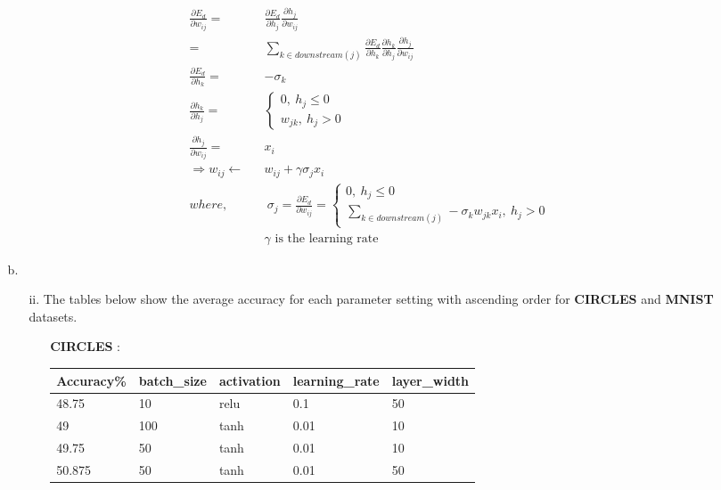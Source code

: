 \begin{enumerate}
\begin{enumerate}
		\begin{eqnarray}
		\frac{\partial E_d}{\partial w_{ij}} = && \frac{\partial E_d}{\partial h_j} \frac{\partial h_j}{\partial w_{ij}}\\
		= &&\sum_{k \in downstream(j)} \frac{\partial E_d}{\partial h_k} \frac{\partial h_k}{\partial h_j} \frac{\partial h_j}{\partial w_{ij}}\\
		\frac{\partial E_d}{\partial h_k} = && -\sigma_k\\
		\frac{\partial h_k}{\partial h_j} = && 
			\begin{cases}
			0, \: h_j \leq0\\
			w_{jk}, \: h_j > 0
			\end{cases}\\
		\frac{\partial h_j}{\partial w_{ij}} = && x_i\\
		\Rightarrow w_{ij} \leftarrow && w_{ij} + \gamma \sigma_j x_i\\
		where, && \: \sigma_j = \frac{\partial E_d}{\partial w_{ij}} = 
			\begin{cases}
			0, \: h_j \leq 0\\
			\sum_{k \in downstream(j)} -\sigma_k w_{jk} x_i, \: h_j>0
			\end{cases}\\
		&& \gamma \text{ is the learning rate}
		\end{eqnarray}
	\pagebreak
	\item[b.]
		\begin{enumerate}
		\item[ii.] The tables below show the average accuracy for each parameter setting with ascending order for \textbf{CIRCLES} and \textbf{MNIST} datasets.
		\begin{enumerate}
		\item[\textbf{CIRCLES}] :
		\begin{center}
		\begin{tabular}{|l|l|l|l|l|}
		\hline
		Accuracy\% & batch\_size & activation     & learning\_rate       & layer\_width         \\ \hline\hline
		48.75    & 10          & relu           & 0.1                  & 50                   \\ \hline
		49       & 100         & tanh           & 0.01                 & 10                   \\ \hline
		49.75    & 50          & tanh           & 0.01                 & 10                   \\ \hline
		50.875   & 50          & tanh           & 0.01                 & 50                   \\ \hline

\end{tabular}
\end{center}
\end{enumerate}
\end{enumerate}
\end{enumerate}
\end{enumerate}
